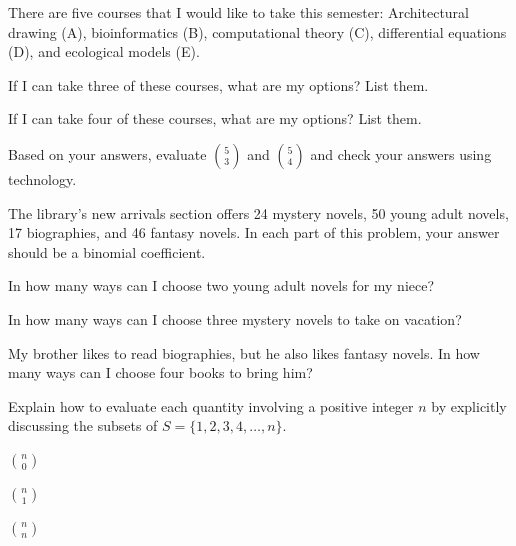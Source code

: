\begin{exer} [\exerP] %
\label{exer_course_selection}
There are five courses that I would like to take this semester: Architectural drawing (A), bioinformatics (B), computational theory (C), differential equations (D), and ecological models (E).
    \begin{exerpart}
        \item If I can take three of these courses, what are my options?  List them.
        \item If I can take four of these courses, what are my options?  List them.
        \item Based on your answers, evaluate $\binom{5}{3}$ and $ \binom{5}{4}$ and check your answers using technology.
    \end{exerpart}
\end{exer}

\begin{exer}[\exerP] %
\label{exer_library_books}
    The library's new arrivals section offers 24 mystery novels, 50 young adult novels, 17 biographies, and 46 fantasy novels. In each part of this problem, your answer should be a binomial coefficient.
        \begin{exerpart}
            \item In how many ways can I choose two young adult novels for my niece? 
            \item In how many ways can I choose three mystery novels to take on vacation?
            \item My brother likes to read biographies, but he also likes fantasy novels.  In how many ways can I choose four books to bring him?
        \end{exerpart}
\end{exer}

\begin{exer} [\exerU] %
\label{exer_eval_edge_binomial_coeffs}
    Explain how to evaluate each quantity involving a positive integer $n$ by explicitly discussing the subsets of $S = \{1,2,3,4,\ldots, n\}$.  
        \begin{exerpart}
            \item $\binom{n}{0}$
            \item $\binom{n}{1}$
            \item $\binom{n}{n}$
        \end{exerpart}
\end{exer}

